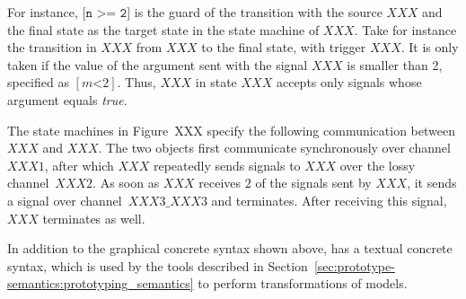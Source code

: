 \begin{address}
For instance, $\texttt{[n >= 2]}$ is the guard of the transition with the source $XXX$ and the final state as the target state in the state machine of $XXX$.
Take for instance the transition in $XXX$ from $XXX$ to the final state, with trigger $XXX$.
It is only taken if the value of the argument sent with the signal $XXX$ is smaller than 2, specified as $[m \texttt{<} 2]$.
Thus, $XXX$ in state $XXX$  accepts only signals whose argument equals \emph{true}.

The state machines in Figure~XXX specify the  following communication between $XXX$ and $XXX$.
The two objects first communicate synchronously over channel~$XXX1$, after which $XXX$ repeatedly sends signals to $XXX$ over the lossy channel~$XXX2$. As soon as $XXX$ receives $2$ of the signals sent by $XXX$, it sends a signal over channel~$XXX3\_XXX3$ and terminates.
After receiving this signal, $XXX$ terminates as well.


In addition to the graphical concrete syntax shown above, \SLCO has a textual concrete syntax, which is used by the tools described in Section~\ref{sec:prototype-semantics:prototyping_semantics} to perform transformations of \SLCO models.
\end{address} 